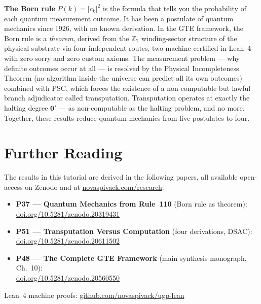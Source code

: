 \documentclass[11pt,a4paper]{article}
\begin{document}
\bigskip
\begin{tcolorbox}[colback=boxblue,colframe=blue!40!black,title=One-paragraph summary]
\textbf{The Born rule} $P(k) = |c_k|^2$ is the formula that tells you the probability
of each quantum measurement outcome.  It has been a postulate of quantum mechanics since
1926, with no known derivation.  In the GTE framework, the Born rule is a \emph{theorem},
derived from the $\mathbb{Z}_7$ winding-sector structure of the physical substrate via
four independent routes, two machine-certified in Lean~4 with zero sorry and zero custom
axioms.  The measurement problem --- why definite outcomes occur at all --- is resolved
by the Physical Incompleteness Theorem (no algorithm inside the universe can predict
all its own outcomes) combined with PSC, which forces the existence of a non-computable
but lawful branch adjudicator called transputation.  Transputation operates at exactly
the halting degree $\mathbf{0}'$ --- as non-computable as the halting problem, and no
more.  Together, these results reduce quantum mechanics from five postulates to four.
\end{tcolorbox}


\section*{Further Reading}
\begin{tcolorbox}[colback=orange!8,colframe=orange!50!black,
  title=\textbf{Primary Sources}]
The results in this tutorial are derived in the following papers,
all available open-access on Zenodo and at
\href{https://novaspivack.com/research}{novaspivack.com/research}:
\begin{itemize}
  \item \textbf{P37 --- Quantum Mechanics from Rule~110} (Born rule as theorem):\\
        \href{https://doi.org/10.5281/zenodo.20319431}{doi.org/10.5281/zenodo.20319431}
  \item \textbf{P51 --- Transputation Versus Computation} (four derivations, DSAC):\\
        \href{https://doi.org/10.5281/zenodo.20611502}{doi.org/10.5281/zenodo.20611502}
  \item \textbf{P48 --- The Complete GTE Framework} (main synthesis monograph, Ch.~10):\\
        \href{https://doi.org/10.5281/zenodo.20560550}{doi.org/10.5281/zenodo.20560550}
\end{itemize}
Lean~4 machine proofs: \href{https://github.com/novaspivack/ugp-lean}{github.com/novaspivack/ugp-lean}
\end{tcolorbox}


\end{document}
